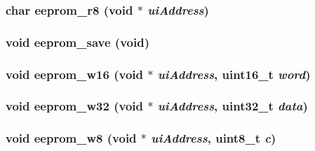 \subsubsection[{eeprom\_\-r8}]{\setlength{\rightskip}{0pt plus 5cm}char eeprom\_\-r8 (void $\ast$ {\em uiAddress})}\label{eeprom_8c_aaf8e0160a22f011071c6eef05108dd02}
\subsubsection[{eeprom\_\-save}]{\setlength{\rightskip}{0pt plus 5cm}void eeprom\_\-save (void)}\label{eeprom_8c_a967222c6b1a76007b1656eca35ff7c08}
\subsubsection[{eeprom\_\-w16}]{\setlength{\rightskip}{0pt plus 5cm}void eeprom\_\-w16 (void $\ast$ {\em uiAddress}, \/  uint16\_\-t {\em word})}\label{eeprom_8c_aacd26e87298620ea075952631cdfe66a}
\subsubsection[{eeprom\_\-w32}]{\setlength{\rightskip}{0pt plus 5cm}void eeprom\_\-w32 (void $\ast$ {\em uiAddress}, \/  uint32\_\-t {\em data})}\label{eeprom_8c_af83bc20fbdc5083109537fd2db28fa13}
\subsubsection[{eeprom\_\-w8}]{\setlength{\rightskip}{0pt plus 5cm}void eeprom\_\-w8 (void $\ast$ {\em uiAddress}, \/  uint8\_\-t {\em c})}\label{eeprom_8c_ab66d92098db926da6dd7f28c9886d884}
